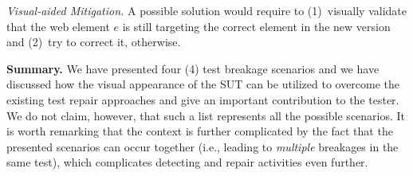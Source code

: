\noindent
\textit{Visual-aided Mitigation.}
A possible solution would require to (1)~visually validate that the web element $e$ is still targeting the correct element in the new version and (2)~try to correct it, otherwise.

\noindent
\textbf{Summary.}
We have presented four (4) test breakage scenarios and we have discussed how the visual appearance of the SUT can be utilized to overcome the existing test repair approaches and give an important contribution to the tester. We do not claim, however, that such a list represents all the possible scenarios. It is worth remarking that the context is further complicated by the fact that the presented scenarios can occur together (i.e., leading to \textit{multiple} breakages in the same test), which complicates detecting and repair activities even further.

